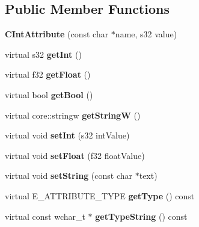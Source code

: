 \subsection*{Public Member Functions}
\begin{DoxyCompactItemize}
\item 
\hypertarget{classirr_1_1io_1_1_c_int_attribute_a0f9e2bfbae58806b31282dc10f8148e9}{{\bfseries C\-Int\-Attribute} (const char $\ast$name, s32 value)}\label{classirr_1_1io_1_1_c_int_attribute_a0f9e2bfbae58806b31282dc10f8148e9}

\item 
\hypertarget{classirr_1_1io_1_1_c_int_attribute_a047ebca9286409d134c4cec689db162b}{virtual s32 {\bfseries get\-Int} ()}\label{classirr_1_1io_1_1_c_int_attribute_a047ebca9286409d134c4cec689db162b}

\item 
\hypertarget{classirr_1_1io_1_1_c_int_attribute_a2fe799f10c03db9fe00b2384172cbbc7}{virtual f32 {\bfseries get\-Float} ()}\label{classirr_1_1io_1_1_c_int_attribute_a2fe799f10c03db9fe00b2384172cbbc7}

\item 
\hypertarget{classirr_1_1io_1_1_c_int_attribute_a8fa444e8ad438d6387f2bbf933f03145}{virtual bool {\bfseries get\-Bool} ()}\label{classirr_1_1io_1_1_c_int_attribute_a8fa444e8ad438d6387f2bbf933f03145}

\item 
\hypertarget{classirr_1_1io_1_1_c_int_attribute_a0c682a72f601cb45e236c93b5c2630e6}{virtual core\-::stringw {\bfseries get\-String\-W} ()}\label{classirr_1_1io_1_1_c_int_attribute_a0c682a72f601cb45e236c93b5c2630e6}

\item 
\hypertarget{classirr_1_1io_1_1_c_int_attribute_a7de3a0574948005e5d240f6c1e35f9c1}{virtual void {\bfseries set\-Int} (s32 int\-Value)}\label{classirr_1_1io_1_1_c_int_attribute_a7de3a0574948005e5d240f6c1e35f9c1}

\item 
\hypertarget{classirr_1_1io_1_1_c_int_attribute_a996032ae6994dc3dc6714a288c6331bf}{virtual void {\bfseries set\-Float} (f32 float\-Value)}\label{classirr_1_1io_1_1_c_int_attribute_a996032ae6994dc3dc6714a288c6331bf}

\item 
\hypertarget{classirr_1_1io_1_1_c_int_attribute_a6fbe25fd712074827274d715ab4bf1fb}{virtual void {\bfseries set\-String} (const char $\ast$text)}\label{classirr_1_1io_1_1_c_int_attribute_a6fbe25fd712074827274d715ab4bf1fb}

\item 
\hypertarget{classirr_1_1io_1_1_c_int_attribute_af0639dbaf238d3bbe5f47d55cdeb90cb}{virtual E\-\_\-\-A\-T\-T\-R\-I\-B\-U\-T\-E\-\_\-\-T\-Y\-P\-E {\bfseries get\-Type} () const }\label{classirr_1_1io_1_1_c_int_attribute_af0639dbaf238d3bbe5f47d55cdeb90cb}

\item 
\hypertarget{classirr_1_1io_1_1_c_int_attribute_a70314833f20eba131fd392caac453b5e}{virtual const wchar\-\_\-t $\ast$ {\bfseries get\-Type\-String} () const }\label{classirr_1_1io_1_1_c_int_attribute_a70314833f20eba131fd392caac453b5e}

\end{DoxyCompactItemize}

